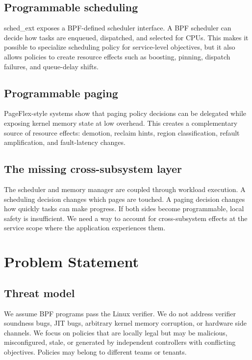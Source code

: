 \documentclass[letterpaper,twocolumn,10pt]{article}
\begin{document}
\subsection{Programmable scheduling}

sched\_ext exposes a BPF-defined scheduler interface. A BPF scheduler can decide how tasks are enqueued, dispatched, and selected for CPUs. This makes it possible to specialize scheduling policy for service-level objectives, but it also allows policies to create resource effects such as boosting, pinning, dispatch failures, and queue-delay shifts.

\subsection{Programmable paging}

PageFlex-style systems show that paging policy decisions can be delegated while exposing kernel memory state at low overhead. This creates a complementary source of resource effects: demotion, reclaim hints, region classification, refault amplification, and fault-latency changes.

\subsection{The missing cross-subsystem layer}

The scheduler and memory manager are coupled through workload execution. A scheduling decision changes which pages are touched. A paging decision changes how quickly tasks can make progress. If both sides become programmable, local safety is insufficient. We need a way to account for cross-subsystem effects at the service scope where the application experiences them.

\section{Problem Statement}

\subsection{Threat model}

We assume BPF programs pass the Linux verifier. We do not address verifier soundness bugs, JIT bugs, arbitrary kernel memory corruption, or hardware side channels. We focus on policies that are locally legal but may be malicious, misconfigured, stale, or generated by independent controllers with conflicting objectives. Policies may belong to different teams or tenants.
\end{document}
